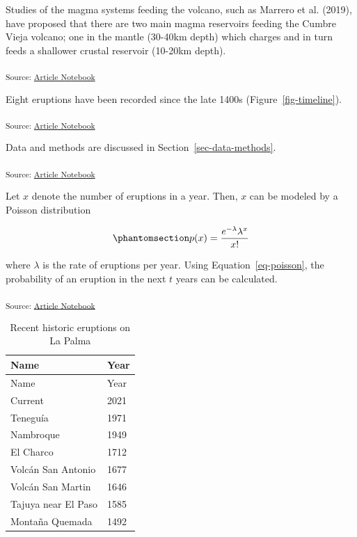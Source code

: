 \documentclass[
]{agujournal2019}
\begin{document}
Studies of the magma systems feeding the volcano, such as Marrero et al.
(2019), have proposed that there are two main magma reservoirs feeding
the Cumbre Vieja volcano; one in the mantle (30-40km depth) which
charges and in turn feeds a shallower crustal reservoir (10-20km depth).

\textsubscript{Source:
\href{https://DSwing.github.io/SP500/index.ipynb.html}{Article
Notebook}}

Eight eruptions have been recorded since the late 1400s
(Figure~\ref{fig-timeline}).

\textsubscript{Source:
\href{https://DSwing.github.io/SP500/index.ipynb.html}{Article
Notebook}}

Data and methods are discussed in Section~\ref{sec-data-methods}.

\textsubscript{Source:
\href{https://DSwing.github.io/SP500/index.ipynb.html}{Article
Notebook}}

Let \(x\) denote the number of eruptions in a year. Then, \(x\) can be
modeled by a Poisson distribution

\begin{equation}\phantomsection\label{eq-poisson}{
p(x) = \frac{e^{-\lambda} \lambda^{x}}{x !}
}\end{equation}

where \(\lambda\) is the rate of eruptions per year. Using
Equation~\ref{eq-poisson}, the probability of an eruption in the next
\(t\) years can be calculated.

\textsubscript{Source:
\href{https://DSwing.github.io/SP500/index.ipynb.html}{Article
Notebook}}

\begin{longtable}[]{@{}ll@{}}
\caption{Recent historic eruptions on La
Palma}\label{tbl-history}\tabularnewline
\toprule\noalign{}
Name & Year \\
\midrule\noalign{}
\endfirsthead
\toprule\noalign{}
Name & Year \\
\midrule\noalign{}
\endhead
\bottomrule\noalign{}
\endlastfoot
Current & 2021 \\
Teneguía & 1971 \\
Nambroque & 1949 \\
El Charco & 1712 \\
Volcán San Antonio & 1677 \\
Volcán San Martin & 1646 \\
Tajuya near El Paso & 1585 \\
Montaña Quemada & 1492 \\
\end{longtable}
\end{document}
